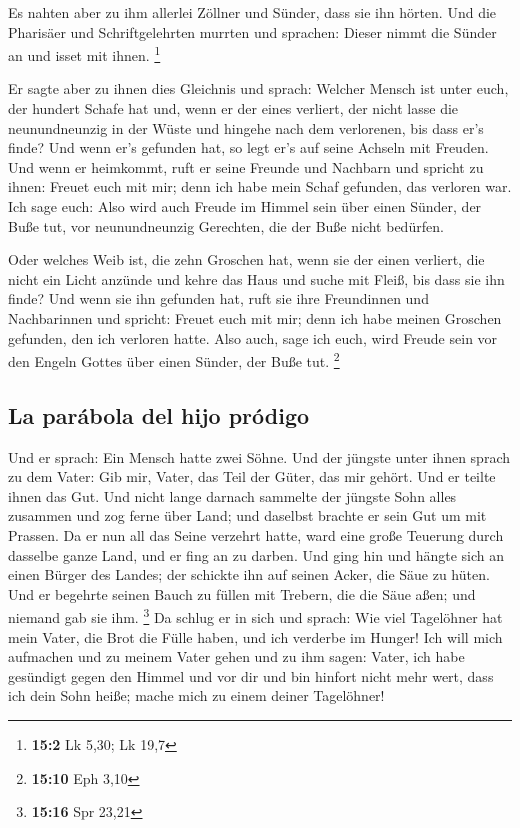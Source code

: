  Es nahten aber zu ihm allerlei Zöllner und Sünder, dass
sie ihn hörten.  Und die Pharisäer und Schriftgelehrten
murrten und sprachen: Dieser nimmt die Sünder an und isset mit ihnen.
\footnote{\textbf{15:2} Lk 5,30; Lk 19,7}

 Er sagte aber zu ihnen dies Gleichnis und sprach:
 Welcher Mensch ist unter euch, der hundert Schafe hat
und, wenn er der eines verliert, der nicht lasse die neunundneunzig in
der Wüste und hingehe nach dem verlorenen, bis dass er's finde?
 Und wenn er's gefunden hat, so legt er's auf seine
Achseln mit Freuden.  Und wenn er heimkommt, ruft er seine
Freunde und Nachbarn und spricht zu ihnen: Freuet euch mit mir; denn ich
habe mein Schaf gefunden, das verloren war.  Ich sage
euch: Also wird auch Freude im Himmel sein über einen Sünder, der Buße
tut, vor neunundneunzig Gerechten, die der Buße nicht bedürfen.

 Oder welches Weib ist, die zehn Groschen hat, wenn sie
der einen verliert, die nicht ein Licht anzünde und kehre das Haus und
suche mit Fleiß, bis dass sie ihn finde?  Und wenn sie ihn
gefunden hat, ruft sie ihre Freundinnen und Nachbarinnen und spricht:
Freuet euch mit mir; denn ich habe meinen Groschen gefunden, den ich
verloren hatte.  Also auch, sage ich euch, wird Freude
sein vor den Engeln Gottes über einen Sünder, der Buße tut. \footnote{\textbf{15:10}
  Eph 3,10}

\hypertarget{la-paruxe1bola-del-hijo-pruxf3digo}{%
\subsection{La parábola del hijo
pródigo}\label{la-paruxe1bola-del-hijo-pruxf3digo}}

 Und er sprach: Ein Mensch hatte zwei Söhne.
 Und der jüngste unter ihnen sprach zu dem Vater: Gib
mir, Vater, das Teil der Güter, das mir gehört. Und er teilte ihnen das
Gut.  Und nicht lange darnach sammelte der jüngste Sohn
alles zusammen und zog ferne über Land; und daselbst brachte er sein Gut
um mit Prassen.  Da er nun all das Seine verzehrt hatte,
ward eine große Teuerung durch dasselbe ganze Land, und er fing an zu
darben.  Und ging hin und hängte sich an einen Bürger des
Landes; der schickte ihn auf seinen Acker, die Säue zu hüten.
 Und er begehrte seinen Bauch zu füllen mit Trebern, die
die Säue aßen; und niemand gab sie ihm. \footnote{\textbf{15:16} Spr
  23,21}  Da schlug er in sich und sprach: Wie viel
Tagelöhner hat mein Vater, die Brot die Fülle haben, und ich verderbe im
Hunger!  Ich will mich aufmachen und zu meinem Vater
gehen und zu ihm sagen: Vater, ich habe gesündigt gegen den Himmel und
vor dir  und bin hinfort nicht mehr wert, dass ich dein
Sohn heiße; mache mich zu einem deiner Tagelöhner!


